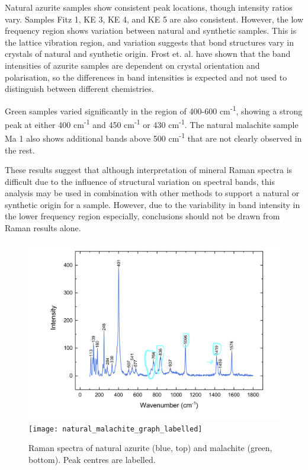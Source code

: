 Natural azurite samples show consistent peak locations, though intensity ratios vary. Samples Fitz 1, KE 3, KE 4, and KE 5 are also consistent. However, the low frequency region shows variation between natural and synthetic samples. This is the lattice vibration region, and variation suggests that bond structures vary in crystals of natural and synthetic origin. Frost et. al. have shown that the band intensities of azurite samples are dependent on crystal orientation and polarisation, so the differences in band intensities is expected and not used to distinguish between different chemistries.~\autocite{Frost}

Green samples varied significantly in the region of 400-600 cm\textsuperscript{-1}, showing a strong peak at either 400 cm\textsuperscript{-1} and 450 cm\textsuperscript{-1} or 430 cm\textsuperscript{-1}. The natural malachite sample Ma 1 also shows additional bands above 500 cm\textsuperscript{-1} that are not clearly observed in the rest. 

These results suggest that although interpretation of mineral Raman spectra is difficult due to the influence of structural variation on spectral bands, this analysis may be used in combination with other methods to support a natural or synthetic origin for a sample. However, due to the variability in band intensity in the lower frequency region especially, conclusions should not be drawn from Raman results alone.

\begin{figure}[H]
\centering
\begin{minipage}[t]{\linewidth}
  \centering
  \includegraphics[width=0.9\linewidth]{az1_blue_withlabels}
\hfill
\texttt{[image: natural\_malachite\_graph\_labelled]}
\hfill
\end{minipage}
\caption[Raman spectra of natural azurite and malachite, peak centres labelled.]{Raman spectra of natural azurite (blue, top) and malachite (green, bottom). Peak centres are labelled.}
\label{fig:label_raman}
\end{figure}

